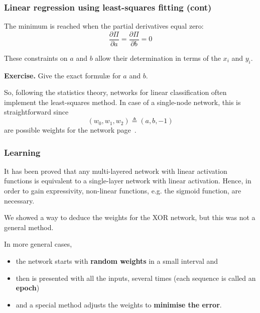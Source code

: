 \documentclass[compress,dvipdfmx]{beamer}
\begin{document}
%
\begin{frame}
\frametitle{Linear regression using
  least-squares fitting (cont)}

The minimum is reached when the partial derivatives equal zero:
\[
  \frac{\partial\Pi}{\partial{a}} =
  \frac{\partial\Pi}{\partial{b}} = 0
\]

\bigskip

These constraints on \(a\) and \(b\) allow their determination in
terms of the \(x_i\) and \(y_i\).

\bigskip

\textbf{Exercise.} Give the exact formul{\ae} for \(a\) and \(b\).

\bigskip

So, following the statistics theory, networks for linear
classification often implement the least-squares method. In case of a
single-node network, this is straightforward since
\[(w_0, w_1, w_2) \triangleq (a, b, -1)\]
are possible weights for the network page~\pageref{linearity}.

\end{frame}

%
\begin{frame}
\frametitle{Learning}

It has been proved that any multi-layered network with linear
activation functions is equivalent to a single-layer network with
linear activation. Hence, in order to gain expressivity, non-linear
functions, e.g. the sigmoid function, are necessary.

\bigskip

We showed a way to deduce the weights for the XOR network, but this
was not a general method.

\bigskip

In more general cases,
\begin{itemize}

  \item the network starts with \textbf{random weights} in a small
  interval and

  \item then is presented with all the inputs, several times (each
  sequence is called an \textbf{epoch})

  \item and a special method adjusts the weights to \textbf{minimise
  the error}.

\end{itemize}

\end{frame}
\end{document}
